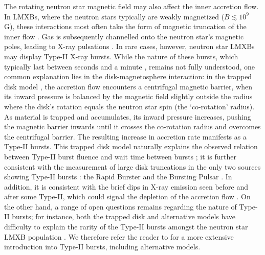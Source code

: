 \documentclass[fleqn,usenatbib]{mnras}
\begin{document}
The rotating neutron star magnetic field may also affect the inner accretion flow. In LMXBs, where the neutron stars typically are weakly magnetized ($B\lesssim10^9$ G), these interactions most often take the form of magnetic truncation of the inner flow \citep{ghosh1978,ludlam2024}. Gas is subsequently channelled onto the neutron star’s magnetic poles, leading to X-ray pulsations \citep[see e.g.,][for a recent review]{disalvo2023}. In rare cases, however, neutron star LMXBs may display Type-II X-ray bursts. While the nature of these bursts, which typically last between seconds and a minute \citep{bagnoli2015}, remains not fully understood, one common explanation lies in the disk-magnetosphere interaction: in the trapped disk model \citep{spruit1993,dangelo2010}, the accretion flow encounters a centrifugal magnetic barrier, when its inward pressure is balanced by the magnetic field slightly outside the radius where the disk’s rotation equals the neutron star spin (the ‘co-rotation’ radius). As material is trapped and accumulates, its inward pressure increases, pushing the magnetic barrier inwards until it crosses the co-rotation radius and overcomes the centrifugal barrier. The resulting increase in accretion rate manifests as a Type-II bursts. This trapped disk model naturally explains the observed relation between Type-II burst fluence and wait time between bursts \citep{bagnoli2015}; it is further consistent with the measurement of large disk truncations in the only two sources showing Type-II bursts : the Rapid Burster \citep[MXB 1730-335;][]{vandeneijnden2017} and the Bursting Pulsar \citep[GRO J1744-28;][]{degenaar2014}. In addition, it is consistent with the brief dips in X-ray emission seen before and after some Type-II, which could signal the depletion of the accretion flow \citep{bagnoli2015,younes2015,court2018}. On the other hand, a range of open questions remains regarding the nature of Type-II bursts; for instance, both the trapped disk and alternative models have difficulty to explain the rarity of the Type-II bursts amongst the neutron star LMXB population \citep[see e.g.][for a recent discussion]{lyutikov2023}. We therefore refer the reader to \citet{bagnoli2015} for a more extensive introduction into Type-II bursts, including alternative models. 
\end{document}
